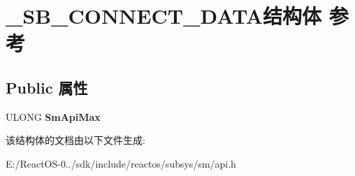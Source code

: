 \hypertarget{struct___s_b___c_o_n_n_e_c_t___d_a_t_a}{}\section{\+\_\+\+S\+B\+\_\+\+C\+O\+N\+N\+E\+C\+T\+\_\+\+D\+A\+T\+A结构体 参考}
\label{struct___s_b___c_o_n_n_e_c_t___d_a_t_a}
\subsection*{Public 属性}
\begin{DoxyCompactItemize}
\item 
\mbox{\label{struct___s_b___c_o_n_n_e_c_t___d_a_t_a_a732c82169b16aa9a4e743316b5c4826f}} 
U\+L\+O\+NG {\bfseries Sm\+Api\+Max}
\end{DoxyCompactItemize}


该结构体的文档由以下文件生成\+:\begin{DoxyCompactItemize}
\item 
E\+:/\+React\+O\+S-\/0../sdk/include/reactos/subsys/sm/api.\+h\end{DoxyCompactItemize}
